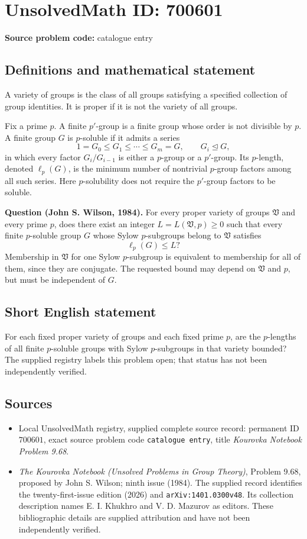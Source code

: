\documentclass[11pt]{article}
\begin{document}
\section*{UnsolvedMath ID: 700601}
\textbf{Source problem code:} catalogue entry
\subsection{Definitions and mathematical statement}
A variety of groups is the class of all groups satisfying a specified collection of group identities. It is proper if it is not the variety of all groups.

Fix a prime \(p\). A finite \(p'\)-group is a finite group whose order is not divisible by \(p\). A finite group \(G\) is \(p\)-soluble if it admits a series
\[
1=G_0\leq G_1\leq\cdots\leq G_m=G,
\qquad G_i\trianglelefteq G,
\]
in which every factor \(G_i/G_{i-1}\) is either a \(p\)-group or a \(p'\)-group. Its \(p\)-length, denoted \(\ell_p(G)\), is the minimum number of nontrivial \(p\)-group factors among all such series. Here \(p\)-solubility does not require the \(p'\)-group factors to be soluble.

\textbf{Question (John S. Wilson, 1984).} For every proper variety of groups \(\mathfrak V\) and every prime \(p\), does there exist an integer \(L=L(\mathfrak V,p)\geq 0\) such that every finite \(p\)-soluble group \(G\) whose Sylow \(p\)-subgroups belong to \(\mathfrak V\) satisfies
\[
\ell_p(G)\leq L?
\]
Membership in \(\mathfrak V\) for one Sylow \(p\)-subgroup is equivalent to membership for all of them, since they are conjugate. The requested bound may depend on \(\mathfrak V\) and \(p\), but must be independent of \(G\).
\subsection{Short English statement}
For each fixed proper variety of groups and each fixed prime \(p\), are the \(p\)-lengths of all finite \(p\)-soluble groups with Sylow \(p\)-subgroups in that variety bounded? The supplied registry labels this problem open; that status has not been independently verified.
\subsection{Sources}
\begin{itemize}
\item Local UnsolvedMath registry, supplied complete source record: permanent ID \(700601\), exact source problem code \texttt{catalogue entry}, title \emph{Kourovka Notebook Problem 9.68}.
\item \emph{The Kourovka Notebook (Unsolved Problems in Group Theory)}, Problem 9.68, proposed by John S. Wilson; ninth issue (1984). The supplied record identifies the twenty-first-issue edition (2026) and \texttt{arXiv:1401.0300v48}. Its collection description names E. I. Khukhro and V. D. Mazurov as editors. These bibliographic details are supplied attribution and have not been independently verified.
\end{itemize}
\end{document}
